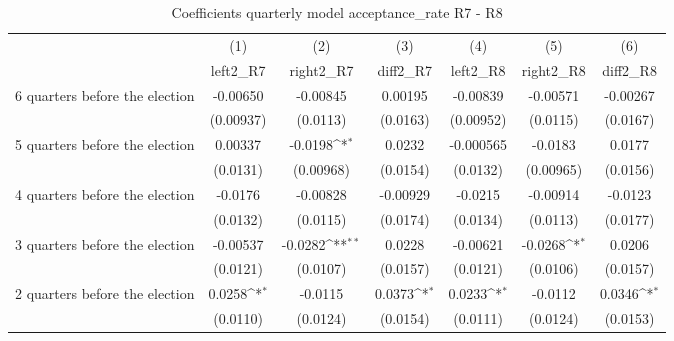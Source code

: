 \begin{table}[!ht]\centering \footnotesize
\def\sym#1{\ifmmode^{#1}\else\(^{#1}\)\fi}
\caption{Coefficients quarterly model acceptance\_rate R7 - R8}
\begin{tabular}{l*{6}{c}}
\hline\hline
                    &\multicolumn{1}{c}{(1)}&\multicolumn{1}{c}{(2)}&\multicolumn{1}{c}{(3)}&\multicolumn{1}{c}{(4)}&\multicolumn{1}{c}{(5)}&\multicolumn{1}{c}{(6)}\\
                    &\multicolumn{1}{c}{left2\_R7}&\multicolumn{1}{c}{right2\_R7}&\multicolumn{1}{c}{diff2\_R7}&\multicolumn{1}{c}{left2\_R8}&\multicolumn{1}{c}{right2\_R8}&\multicolumn{1}{c}{diff2\_R8}\\
\hline
 6 quarters before the election&    -0.00650         &    -0.00845         &     0.00195         &    -0.00839         &    -0.00571         &    -0.00267         \\
                    &   (0.00937)         &    (0.0113)         &    (0.0163)         &   (0.00952)         &    (0.0115)         &    (0.0167)         \\
[1em]
 5 quarters before the election&     0.00337         &     -0.0198\sym{*}  &      0.0232         &   -0.000565         &     -0.0183         &      0.0177         \\
                    &    (0.0131)         &   (0.00968)         &    (0.0154)         &    (0.0132)         &   (0.00965)         &    (0.0156)         \\
[1em]
 4 quarters before the election&     -0.0176         &    -0.00828         &    -0.00929         &     -0.0215         &    -0.00914         &     -0.0123         \\
                    &    (0.0132)         &    (0.0115)         &    (0.0174)         &    (0.0134)         &    (0.0113)         &    (0.0177)         \\
[1em]
 3 quarters before the election&    -0.00537         &     -0.0282\sym{**} &      0.0228         &    -0.00621         &     -0.0268\sym{*}  &      0.0206         \\
                    &    (0.0121)         &    (0.0107)         &    (0.0157)         &    (0.0121)         &    (0.0106)         &    (0.0157)         \\
[1em]
 2 quarters before the election&      0.0258\sym{*}  &     -0.0115         &      0.0373\sym{*}  &      0.0233\sym{*}  &     -0.0112         &      0.0346\sym{*}  \\
                    &    (0.0110)         &    (0.0124)         &    (0.0154)         &    (0.0111)         &    (0.0124)         &    (0.0153)         \\

\end{tabular}
\end{table}
